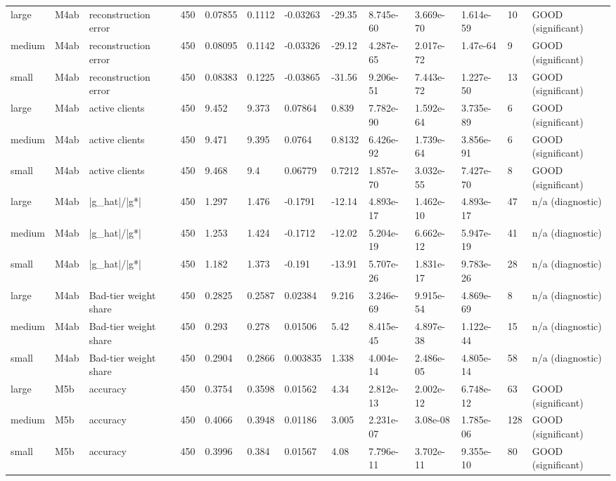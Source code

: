 \begin{table}[t]
\begin{tabular}{lllllllllllll}
large & M4ab & reconstruction error & 450 & 0.07855 & 0.1112 & -0.03263 & -29.35 & 8.745e-60 & 3.669e-70 & 1.614e-59 & 10 & GOOD (significant) \\
medium & M4ab & reconstruction error & 450 & 0.08095 & 0.1142 & -0.03326 & -29.12 & 4.287e-65 & 2.017e-72 & 1.47e-64 & 9 & GOOD (significant) \\
small & M4ab & reconstruction error & 450 & 0.08383 & 0.1225 & -0.03865 & -31.56 & 9.206e-51 & 7.443e-72 & 1.227e-50 & 13 & GOOD (significant) \\
large & M4ab & active clients & 450 & 9.452 & 9.373 & 0.07864 & 0.839 & 7.782e-90 & 1.592e-64 & 3.735e-89 & 6 & GOOD (significant) \\
medium & M4ab & active clients & 450 & 9.471 & 9.395 & 0.0764 & 0.8132 & 6.426e-92 & 1.739e-64 & 3.856e-91 & 6 & GOOD (significant) \\
small & M4ab & active clients & 450 & 9.468 & 9.4 & 0.06779 & 0.7212 & 1.857e-70 & 3.032e-55 & 7.427e-70 & 8 & GOOD (significant) \\
large & M4ab & |g\_hat|/|g*| & 450 & 1.297 & 1.476 & -0.1791 & -12.14 & 4.893e-17 & 1.462e-10 & 4.893e-17 & 47 & n/a (diagnostic) \\
medium & M4ab & |g\_hat|/|g*| & 450 & 1.253 & 1.424 & -0.1712 & -12.02 & 5.204e-19 & 6.662e-12 & 5.947e-19 & 41 & n/a (diagnostic) \\
small & M4ab & |g\_hat|/|g*| & 450 & 1.182 & 1.373 & -0.191 & -13.91 & 5.707e-26 & 1.831e-17 & 9.783e-26 & 28 & n/a (diagnostic) \\
large & M4ab & Bad-tier weight share & 450 & 0.2825 & 0.2587 & 0.02384 & 9.216 & 3.246e-69 & 9.915e-54 & 4.869e-69 & 8 & n/a (diagnostic) \\
medium & M4ab & Bad-tier weight share & 450 & 0.293 & 0.278 & 0.01506 & 5.42 & 8.415e-45 & 4.897e-38 & 1.122e-44 & 15 & n/a (diagnostic) \\
small & M4ab & Bad-tier weight share & 450 & 0.2904 & 0.2866 & 0.003835 & 1.338 & 4.004e-14 & 2.486e-05 & 4.805e-14 & 58 & n/a (diagnostic) \\
large & M5b & accuracy & 450 & 0.3754 & 0.3598 & 0.01562 & 4.34 & 2.812e-13 & 2.002e-12 & 6.748e-12 & 63 & GOOD (significant) \\
medium & M5b & accuracy & 450 & 0.4066 & 0.3948 & 0.01186 & 3.005 & 2.231e-07 & 3.08e-08 & 1.785e-06 & 128 & GOOD (significant) \\
small & M5b & accuracy & 450 & 0.3996 & 0.384 & 0.01567 & 4.08 & 7.796e-11 & 3.702e-11 & 9.355e-10 & 80 & GOOD (significant) \\

\end{tabular}
\end{table}
